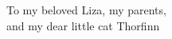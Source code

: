 \thispagestyle{empty}

\vspace*{18cm}

\begin{flushright}
    To my beloved Liza, my parents,\\
    and my dear little cat Thorfinn
\end{flushright}

